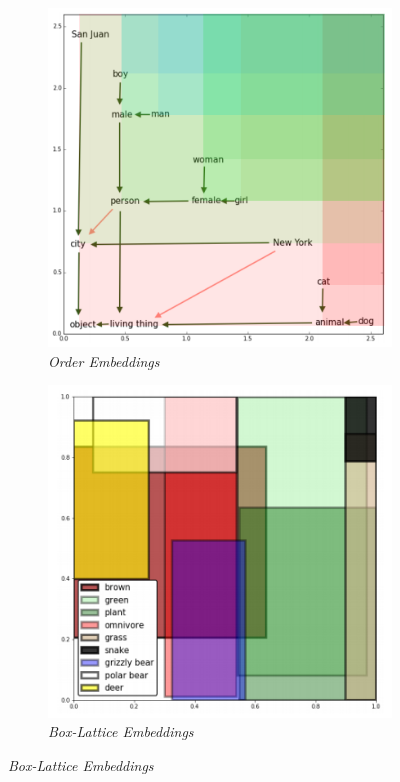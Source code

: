 \begin{figure}[h]
    \begin{subfigure}{.32\textwidth}
          \centering
          \includegraphics[width=.8\linewidth]{img/orderembboxed.png}  
          \caption{\textit{Order Embeddings}}
          \label{subfig:orderemb}
    \end{subfigure}
    \begin{subfigure}{.33\textwidth}
          \centering
          \includegraphics[width=.8\linewidth]{img/emb-boxlattice.png}  
          \caption{\textit{Box-Lattice Embeddings}}
          \label{subfig:boxlatticeemb}

\end{subfigure}
\end{figure}
